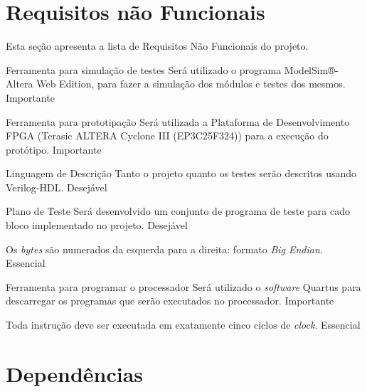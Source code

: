 \documentclass{article}
\begin{document}
\section{Requisitos não Funcionais}
Esta seção apresenta a lista de Requisitos Não Funcionais do projeto.

  \begin{nonfunctional}

    \requirement
    {Ferramenta para simulação de testes}
    {Será utilizado o programa ModelSim®-Altera Web Edition, para fazer a simulação dos módulos e testes dos mesmos.}
    {Importante}

    \requirement
    {Ferramenta para prototipação}
    {Será utilizada a Plataforma de Desenvolvimento FPGA  (Terasic ALTERA Cyclone III (EP3C25F324)) para a execução do protótipo.}
    {Importante}

    \requirement
    {Linguagem de Descrição}
    {Tanto o projeto quanto os testes serão descritos usando Verilog-HDL.}
    {Desejável}

    \requirement
    {Plano de Teste}
    {Será desenvolvido um conjunto de programa de teste para cado bloco implementado no projeto. }
    {Desejável}

    {Os \textit{bytes} são numerados da esquerda para a direita: formato \textit{Big Endian}.}
    {Essencial}

    \requirement
    {Ferramenta para programar o processador}
    {Será utilizado o \textit{software} Quartus para descarregar os programas que serão executados no processador.}
    {Importante}


    {Toda instrução deve ser executada em exatamente cinco ciclos de \textit{clock}.}
    {Essencial}

  \end{nonfunctional}

\section{Dependências}

  \begin{dependencies}
\end{dependencies}

% 
% 
\end{document}
